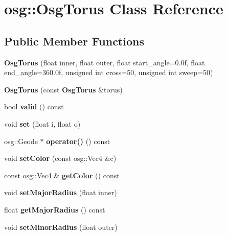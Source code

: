 \section{osg\-:\-:Osg\-Torus Class Reference}
\label{classosg_1_1OsgTorus}
\subsection*{Public Member Functions}
\begin{DoxyCompactItemize}
\item 
{\bfseries Osg\-Torus} (float inner, float outer, float start\-\_\-angle=0.\-0f, float end\-\_\-angle=360.\-0f, unsigned int cross=50, unsigned int sweep=50)\label{classosg_1_1OsgTorus_a1cdee09d1a089d8ee6e1fa8d2209f259}

\item 
{\bfseries Osg\-Torus} (const {\bf Osg\-Torus} \&torus)\label{classosg_1_1OsgTorus_a2a3338b9d7fcc1360aea800384bf577d}

\item 
bool {\bfseries valid} () const \label{classosg_1_1OsgTorus_afdacac9241e1c4a404e57e8e70286a48}

\item 
void {\bfseries set} (float i, float o)\label{classosg_1_1OsgTorus_a3f7956c72d7942eb1b0981bae40c8e6b}

\item 
osg\-::\-Geode $\ast$ {\bfseries operator()} () const \label{classosg_1_1OsgTorus_a3bba248565198907dae7d96a54e8159a}

\item 
void {\bfseries set\-Color} (const osg\-::\-Vec4 \&c)\label{classosg_1_1OsgTorus_a47b24fe31f43d4a4a1750e346cc612fb}

\item 
const osg\-::\-Vec4 \& {\bfseries get\-Color} () const \label{classosg_1_1OsgTorus_aef2c9183f791ceaf0b1c5e66aa756b17}

\item 
void {\bfseries set\-Major\-Radius} (float inner)\label{classosg_1_1OsgTorus_a2dd54eb69fec958fddbcb23ceabc26a1}

\item 
float {\bfseries get\-Major\-Radius} () const \label{classosg_1_1OsgTorus_aa2201bb7be1b26215ae1331d6bd88071}

\item 
void {\bfseries set\-Minor\-Radius} (float outer)\label{classosg_1_1OsgTorus_a14a4432d6d107c8a6c08a5c6a701fe73}


\end{DoxyCompactItemize}
